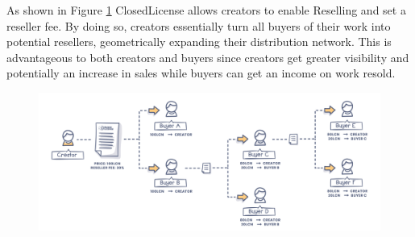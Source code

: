 As shown in Figure \ref{fig:reselling} ClosedLicense allows creators to enable Reselling and set a reseller fee. By doing so, creators essentially turn all buyers of their work into potential resellers, geometrically expanding their distribution network. This is advantageous to both creators and buyers since creators get greater visibility and potentially an increase in sales while buyers can get an income on work resold.

\begin{figure}[!htbp]
\begin{minipage}{1\textwidth}
  \centering
  \includegraphics[width=1\linewidth]{./figures/fig6.png}
  \label{fig:reselling}
\end{minipage}
\end{figure}
